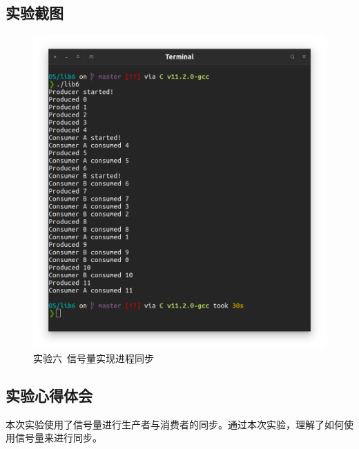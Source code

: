\documentclass{article}
\begin{document}
		\subsection{实验截图}
			\begin{figure}[htbp]
				\centering
				\includegraphics[width=\textwidth]{lib6/Screenshot.png}
				\caption{实验六\ 信号量实现进程同步}
			\end{figure}

		\subsection{实验心得体会}
			本次实验使用了信号量进行生产者与消费者的同步。通过本次实验，理解了如何使用信号量来进行同步。
\end{document}
